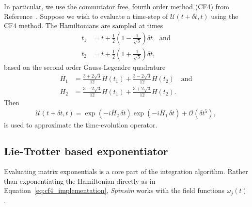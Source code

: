 \documentclass{jors}
\begin{document}
		In particular, we use the commutator free, fourth order method (CF4) from Reference~\cite{auer_magnus_2018}.
		Suppose we wish to evaluate a time-step of $ \mathcal{U}(t + \delta t, t) $ using the CF4 method.
		The Hamiltonians are sampled at times
		\begin{align}
			t_1 &= t + \frac12 \left(1 - \frac{1}{\sqrt{3}}\right)\delta t\quad\text{and}\\
			t_2 &= t + \frac12 \left(1 + \frac{1}{\sqrt{3}}\right)\delta t,
		\end{align} %
		based on the second order Gauss-Legendre quadrature
		\begin{align}
			\overline{H}_1 &= \frac{3 + 2\sqrt{3}}{12}H(t_1) + \frac{3 - 2\sqrt{3}}{12}H(t_2)\quad\text{and}\label{eq:cf4_sample_1}\\
			\overline{H}_2 &= \frac{3 - 2\sqrt{3}}{12}H(t_1) + \frac{3 + 2\sqrt{3}}{12}H(t_2).\label{eq:cf4_sample_2}
		\end{align}
		Then
		\begin{align}
			\mathcal{U}(t + \delta t, t) = \exp(-i\overline{H}_2\,\delta t)\exp(-i\overline{H}_1\,\delta t) + \mathcal{O}(\delta t^5),\label{eq:cf4_implementation}
		\end{align}%
		is used to approximate the time-evolution operator.

	\subsection{Lie-Trotter based exponentiator}
		Evaluating matrix exponentials is a core part of the integration algorithm.
		Rather than exponentiating the Hamiltonian directly as in Equation~\eqref{eq:cf4_implementation}, \emph{Spinsim} works with the field functions $ \omega_j(t) $.
\end{document}
